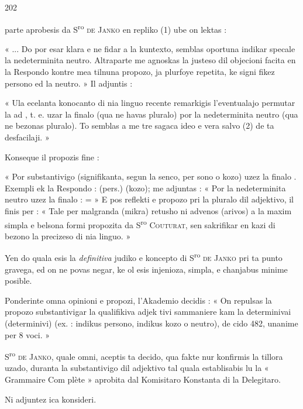 \begin{VUpage}[206]{202}

\VUcontinue
parte aprobesis da S\textsuperscript{ro} \textsc{de Janko} en repliko (1) ube on\nl
lektas :

« ... Do por esar klara e ne fidar a la kuntexto, semblas\nl
oportuna indikar specale la nedeterminita neutro. Altraparte\nl
me agnoskas la justeso dil objecioni facita en la Respondo\nl
kontre mea tilnuna propozo, ja plurfoye repetita, ke  signi\cc
fikez persono ed  la neutro. » Il adjuntis :

« Ula ecelanta konocanto di nia linguo recente remarkigis\nl
l'eventualajo permutar la  ad , t. e. uzar la finalo \nl
(qua ne havas pluralo) por la nedeterminita neutro (qua\nl
ne bezonas pluralo). To semblas a me tre sagaca ideo e vera\nl
salvo (2) de ta desfacilaji. »

Konseque il propozis fine :

« Por substantivigo (signifikanta, segun la senco, per\cc
sono o kozo) uzez la finalo . Exempli ek la Respondo :\nl
{} (pers.)  (kozo); me adjuntas :\nl
{} « Por la nedeterminita neutro uzez la finalo  :\nl
{} =\nl
{} » E pos reflekti e propozo pri la pluralo dil\nl
adjektivo, il finis per : « Tale per malgranda (mikra)\nl
retusho ni advenos (arivos) a la maxim simpla e belsona\nl
formi propozita da S\textsuperscript{ro} \textsc{Couturat}, sen sakrifikar en kazi di\nl
bezono la precizeso di nia linguo. »

Yen do quala esis la \textit{definitiva} judiko e koncepto di\nl
S\textsuperscript{ro} \textsc{de Janko} pri ta punto gravega, ed on ne povas negar,\nl
ke ol esis injenioza, simpla, e chanjabus minime posible.

Ponderinte omna opinioni e propozi, l'Akademio decidis :\nl
« On repulsas la propozo substantivigar la qualifikiva adjek\cc
tivi sammaniere kam la determinivai (determinivi) (ex. :\nl
{} indikus persono,  indikus kozo o neutro), de\cc
cido 482, unanime per 8 voci. »

S\textsuperscript{ro} \textsc{de Janko}, quale omni, aceptis ta decido, qua fakte nur\nl
konfirmis la tillora uzado, duranta la substantivigo dil\nl
adjektivo tal quala establisabis lu la « Grammaire Com\cc
plète » aprobita dal Komisitaro Konstanta di la Delegitaro.\parplein

Ni adjuntez ica konsideri.
\end{VUpage}

